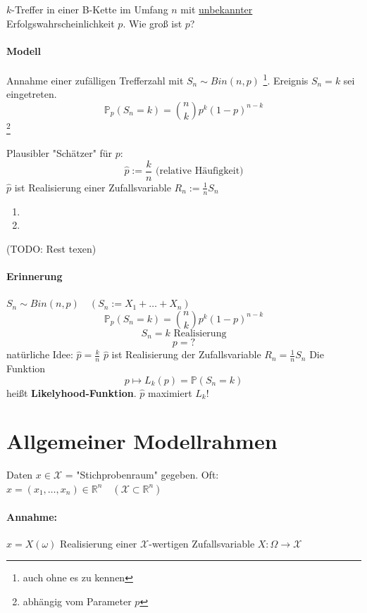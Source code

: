 \documentclass[a4paper,11pt,notitlepage]{report}
\newcommand{\R}{{\ensuremath{\mathbb{R}}}}
\newcommand{\Prim}{{\ensuremath{\mathbb{P}}}}
\begin{document}
$k$-Treffer in einer B-Kette im Umfang $n$ mit \underline{unbekannter} Erfolgswahrscheinlichkeit $p$.
\newline
Wie groß ist $p$?

\paragraph{Modell}
Annahme einer zufälligen Trefferzahl mit $S_n \sim Bin(n,p)$ \footnote{auch ohne es zu kennen}.
\newline
Ereignis $S_n = k$ sei eingetreten.
$$\Prim_p (S_n = k) = {n \choose k} p^k (1-p)^{n-k}$$ \footnote{abhängig vom Parameter $p$}

Plausibler "Schätzer" für $p$:
$$\hat{p} := \frac{k}{n} \text{ (relative Häufigkeit)}$$
$\hat{p}$ ist Realisierung einer Zufallsvariable $R_n := \frac{1}{n} S_n$

\begin{enumerate}
	\item
	\item
\end{enumerate}

(TODO: Rest texen)



\paragraph{Erinnerung}
$S_n \sim Bin(n,p) \quad (S_n := X_1 + \ldots + X_n)$
$$\Prim_p (S_n = k) = {n \choose k} p^k (1-p)^{n-k}$$
$$S_n = k \text{ Realisierung}$$
$$p = ?$$
natürliche Idee: $\hat{p} = \frac{k}{n}$
\newline
$\hat{p}$ ist Realisierung der Zufallsvariable $R_n = \frac{1}{n} S_n$
\newline
Die Funktion
$$p \mapsto L_k(p) = \Prim(S_n = k)$$
heißt \textbf{Likelyhood-Funktion}.
\newline
$\hat{p}$ maximiert $L_k$!

\section{Allgemeiner Modellrahmen}

Daten $x \in \mathcal{X}$ = "Stichprobenraum" gegeben. \newline
Oft: $x = (x_1, \ldots, x_n) \in \R^n \quad (\mathcal{X} \subset \R^n)$

\paragraph{Annahme:}
$x = X(\omega)$ Realisierung einer $\mathcal{X}$-wertigen Zufallsvariable $X \colon \Omega \rightarrow \mathcal{X}$
\end{document}

